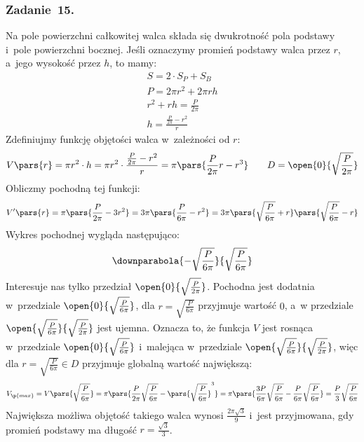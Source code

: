 \subsubsection*{Zadanie~15.}
Na pole powierzchni całkowitej walca składa się dwukrotność pola podstawy i~pole powierzchni bocznej. Jeśli oznaczymy promień podstawy walca przez \(r\), a~jego wysokość przez \(h\), to mamy:
\begin{gather*}
    S = 2 \cdot S_P + S_B\\
    P = 2\pi r^2 + 2\pi r h\\
    r^2 + rh = \frac{P}{2\pi}\\
    h = \frac{\frac{P}{2\pi} - r^2}{r}
\end{gather*}
Zdefiniujmy funkcję objętości walca w~zależności od \(r\):
\begin{equation*}
    V\pars{r}
        = \pi r^2 \cdot h
        = \pi r^2 \cdot \frac{\frac{P}{2\pi} - r^2}{r}
        = \pi\pars{\frac{P}{2\pi}r - r^3} \qquad D = \open{0}{\sqrt{\frac{P}{2\pi}}}
\end{equation*}
Obliczmy pochodną tej funkcji:
\begin{equation*}
    V'\pars{r}
        = \pi\pars{\frac{P}{2\pi} - 3r^2}
        = 3\pi\pars{\frac{P}{6\pi} - r^2}
        = 3\pi\pars{\sqrt{\frac{P}{6\pi}} + r}\pars{\sqrt{\frac{P}{6\pi}} - r}
\end{equation*}
Wykres pochodnej wygląda następująco:
\begin{equation*}
    \downparabola{-\sqrt{\frac{P}{6\pi}}}{\sqrt{\frac{P}{6\pi}}}
\end{equation*}
Interesuje nas tylko przedział \(\open{0}{\sqrt{\frac{P}{2\pi}}}\). Pochodna jest dodatnia w~przedziale \(\open{0}{\sqrt{\frac{P}{6\pi}}}\), dla \(r = \sqrt{\frac{P}{6\pi}}\) przyjmuje wartość \(0\), a~w przedziale \(\open{\sqrt{\frac{P}{6\pi}}}{\sqrt{\frac{P}{2\pi}}}\) jest ujemna. Oznacza to, że funkcja \(V\) jest rosnąca w~przedziale \(\open{0}{\sqrt{\frac{P}{6\pi}}}\) i~malejąca w~przedziale \(\open{\sqrt{\frac{P}{6\pi}}}{\sqrt{\frac{P}{2\pi}}}\), więc dla \(r = \sqrt{\frac{P}{6\pi}} \in D\) przyjmuje globalną wartość największą:
\begin{equation*}
    V_\p{max}
        = V\pars{\sqrt{\frac{P}{6\pi}}}
        = \pi\pars{\frac{P}{2\pi}\sqrt{\frac{P}{6\pi}} - \pars{\sqrt{\frac{P}{6\pi}}}^3}
        = \pi\pars{\frac{3P}{6\pi}\sqrt{\frac{P}{6\pi}} - \frac{P}{6\pi}\sqrt{\frac{P}{6\pi}}}
        = \frac{P}{3}\sqrt{\frac{P}{6\pi}}
\end{equation*}
Największa możliwa objętość takiego walca wynosi \(\frac{2\pi\sqrt{3}}{9}\) i~jest przyjmowana, gdy promień podstawy ma długość \(r = \frac{\sqrt{3}}{3}\).

